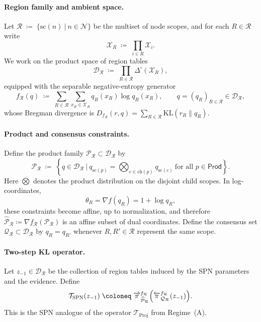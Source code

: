 \documentclass[12pt]{article}
\newcommand{\1}{\mathbb{1}}
\newcommand{\defeq}{\coloneq}
\newcommand{\menge}[2]{\big\{{#1}~\big |~{#2}\big\}}
\newcommand{\Menge}[2]{\left\{{#1}~\Big|~{#2}\right\}}
\theoremstyle{definition}
\newcommand{\Iproj}{\overleftarrow{\pi}}     %
\newcommand{\Rproj}{\overrightarrow{\pi}}    %
\begin{document}
\paragraph{Region family and ambient space.}
Let $\mathcal R \;\defeq\; \menge{\mathrm{sc}(n)}{n\in\mathcal N}$ be the multiset of node scopes, and for each $R\in\mathcal R$ write
\[
\mathcal X_R \;\defeq\; \prod_{i\in R}\mathcal X_i .
\]
We work on the product space of region tables
\[
\mathcal D_{\mathcal R}
\;\defeq\;
\prod_{R\in\mathcal R}\Delta^\circ(\mathcal X_R),
\]
equipped with the separable negative-entropy generator
\[
f_{\mathcal R}(q)
\;\defeq\;
\sum_{R\in\mathcal R}\sum_{x_R\in\mathcal X_R} q_R(x_R)\log q_R(x_R),
\qquad
q=(q_R)_{R\in\mathcal R}\in\mathcal D_{\mathcal R},
\]
whose Bregman divergence is $D_{f_{\mathcal R}}(r,q)
= \sum_{R\in\mathcal R}\mathrm{KL}(r_R\|q_R)$.


\paragraph{Product and consensus constraints.}
Define the product family $\mathcal P_{\mathcal R}\subset\mathcal D_{\mathcal R}$ by
\[
\mathcal P_{\mathcal R}
\;\defeq\;
\Menge{
q\in\mathcal D_{\mathcal R}}{
q_{\mathrm{sc}(p)}
=
\bigotimes_{c\in\mathrm{ch}(p)} q_{\mathrm{sc}(c)}
\ \text{for all } p\in\mathsf{Prod}
}.
\]
Here $\bigotimes$ denotes the product distribution on the disjoint child scopes. In log-coordinates,
\[
\theta_R=\nabla f(q_R)=1+\log q_R,
\]
these constraints become affine, up to normalization, and therefore $\widehat{\mathcal P}_{\mathcal R}
\defeq
\nabla f_{\mathcal R}(\mathcal P_{\mathcal R})$ is an affine subset of dual coordinates. Define the consensus set $\mathcal Q_{\mathcal R}\subset\mathcal D_{\mathcal R}$ by $q_R=q_{R'}$
whenever $R,R'\in\mathcal R$ represent the same scope.

\paragraph{Two-step KL operator.}
Let $z_{-1}\in\mathcal D_{\mathcal R}$ be the collection of region tables induced by the SPN parameters and the evidence. Define
\begin{equation*}
\label{eq:spn-two-step}
\mathcal T_{\mathrm{SPN}}(z_{-1})
\;\defeq\;
\Rproj^{f_{\mathcal R}}_{\widehat{\mathcal P}_{\mathcal R}}
\Bigl(
  \Iproj^{f_{\mathcal R}}_{\mathcal Q_{\mathcal R}}(z_{-1})
\Bigr).
\end{equation*}
This is the SPN analogue of the operator $\mathcal T_{\mathrm{Proj}}$ from Regime~(A).
\end{document}
